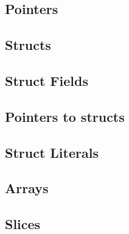 \subsection{Pointers}




\subsection{Structs}




\subsection{Struct Fields}




\subsection{Pointers to structs}




\subsection{Struct Literals}




\subsection{Arrays}




\subsection{Slices}




